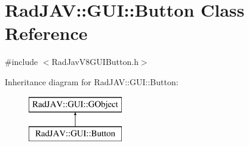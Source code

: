 \hypertarget{class_rad_j_a_v_1_1_g_u_i_1_1_button}{}\section{Rad\+J\+AV\+:\+:G\+UI\+:\+:Button Class Reference}
\label{class_rad_j_a_v_1_1_g_u_i_1_1_button}


{\ttfamily \#include $<$Rad\+Jav\+V8\+G\+U\+I\+Button.\+h$>$}

Inheritance diagram for Rad\+J\+AV\+:\+:G\+UI\+:\+:Button\+:\begin{figure}[H]
\begin{center}
\leavevmode
\includegraphics[height=2.000000cm]{class_rad_j_a_v_1_1_g_u_i_1_1_button}
\end{center}
\end{figure}
